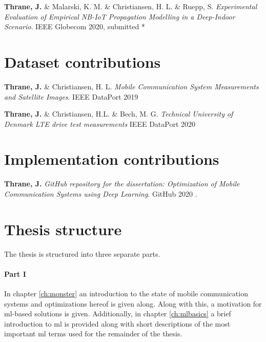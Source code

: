 \vspace{2em}
\noindent \textbf{Thrane, J.} \&  Malarski, K. M. \& Christiansen, H. L. \& Ruepp, S. \textit{Experimental Evaluation of Empirical NB-IoT Propagation Modelling in a Deep-Indoor Scenario}. IEEE Globecom 2020, submitted \cite{Thrane2020ExperimentalScenario} *


\section*{Dataset contributions}

\noindent \textbf{Thrane, J.} \& Christiansen, H. L. \textit{Mobile Communication System Measurements and Satellite Images}. IEEE DataPort 2019 \cite{1xf4-eg98-19}

\vspace{2em}
\noindent \textbf{Thrane, J.} \& Christiansen, H.L. \& Bech, M. G. \textit{Technical University of Denmark LTE drive test measurements} IEEE DataPort 2020 \cite{keyt-8g44-20}

\section*{Implementation contributions}

\noindent \textbf{Thrane, J.} \textit{GitHub repository for the dissertation: Optimization of Mobile Communication Systems using Deep Learning}. GitHub 2020 \cite{Thrane2020RepositoryLearning}.


\section*{Thesis structure}
 
The thesis is structured into three separate parts. 

\paragraph{Part I} In chapter \ref{ch:monster} an introduction to the state of mobile communication systems and optimizations hereof is given along. Along with this, a motivation for \gls{ml}-based solutions is given. Additionally, in chapter \ref{ch:mlbasics} a brief introduction to \gls{ml} is provided along with short descriptions of the most important \gls{ml} terms used for the remainder of the thesis. 

